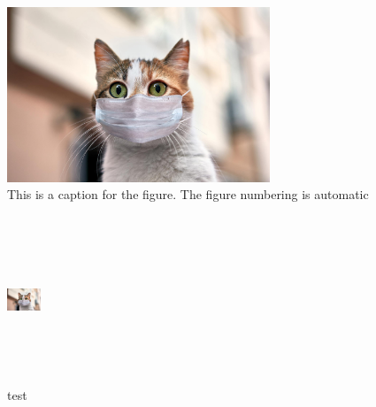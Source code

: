 \documentclass[11pt, twoside]{article}
\begin{document}
\begin{figure}[H]
    \centering
    \includegraphics[width=0.7\textwidth]{figures/cat.jpg}
    \caption{This is a caption for the figure. The figure numbering is automatic}
    \label{fig:cat}
\end{figure}

\vspace{5cm}

\begin{figure}[H]
    \centering
    \includegraphics[width=1cm,height=5cm]{figures/cat.jpg}
    \caption{test}
\end{figure}
\end{document}
